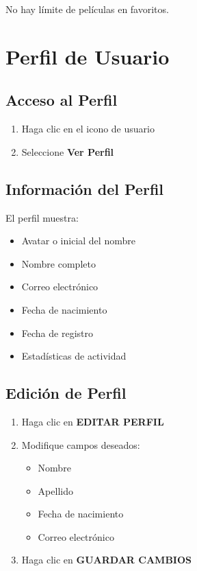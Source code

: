 \documentclass[11pt,a4paper,twoside]{book}
\begin{document}
\begin{infobox}
No hay límite de películas en favoritos.
\end{infobox}

\chapter{Perfil de Usuario}

\section{Acceso al Perfil}

\begin{enumerate}
    \item Haga clic en el icono de usuario
    \item Seleccione \textbf{Ver Perfil}
\end{enumerate}

\section{Información del Perfil}

El perfil muestra:
\begin{itemize}
    \item Avatar o inicial del nombre
    \item Nombre completo
    \item Correo electrónico
    \item Fecha de nacimiento
    \item Fecha de registro
    \item Estadísticas de actividad
\end{itemize}

\section{Edición de Perfil}

\begin{enumerate}
    \item Haga clic en \textbf{EDITAR PERFIL}
    \item Modifique campos deseados:
    \begin{itemize}
        \item Nombre
        \item Apellido
        \item Fecha de nacimiento
        \item Correo electrónico
    \end{itemize}
    \item Haga clic en \textbf{GUARDAR CAMBIOS}
\end{enumerate}
\end{document}

